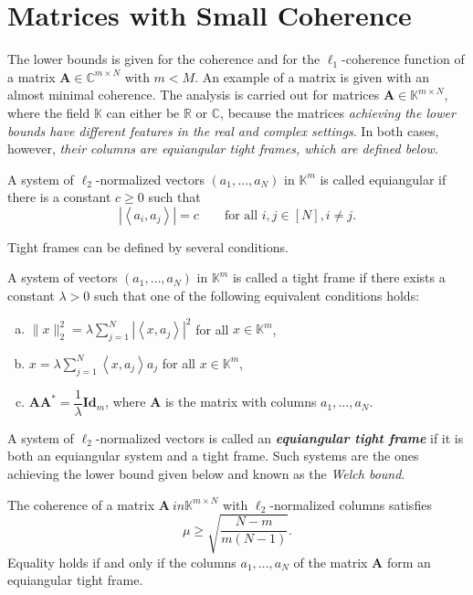 \section{Matrices with Small Coherence}
The lower bounds is given for the coherence and for the $\ell_1$-coherence function of a matrix $\mathbf{A} \in \mathbb{C}^{m \times N}$ with $m < M$. An example of a matrix is given with an almost minimal coherence. The analysis is carried out for matrices $\mathbf{A} \in \mathbb{K}^{m \times N}$, where the field $\mathbb{K}$ can either be $\mathbb{R}$ or $\mathbb{C}$, because the matrices \emph{\textcolor[rgb]{1,0,0}{achieving the lower bounds have different features in the real and complex settings}}. In both cases, however, \emph{their columns are equiangular \textcolor[rgb]{1,0,0}{tight frames}, which are defined below}.
\begin{definition}
    \label{def1.5}
    A system of $\ell_2$-normalized vectors $(a_1,\dots,a_N)$ in $\mathbb{K}^m$ is called \textcolor[rgb]{1,0,0}{equiangular} if there is a constant $c \geq 0$ such that
    \begin{equation*}
        \left|\left<a_i,a_j\right>\right| = c \qquad \text{for all }i, j \in [N], i \neq j.
    \end{equation*}
\end{definition}

Tight frames can be defined by several conditions.

\begin{definition}
    \label{def1.6}
    A system of vectors $(a_1,\dots,a_N)$ in $\mathbb{K}^m$ is called a \textcolor[rgb]{1,0,0}{tight frame} if there exists a constant $\lambda > 0$ such that one of the following equivalent conditions holds:
    \begin{enumerate} [(a)]
        \item $\|x\|_2^2 = \lambda \sum\limits_{j = 1}^N\left|\left<x, a_j\right>\right|^2$ for all $x\in \mathbb{K}^m$,
        \item $x = \lambda \sum\limits_{j=1}^N\left<x,a_j\right>a_j$ for all $x \in \mathbb{K}^m$,
        \item $\mathbf{AA}^* = \dfrac{1}{\lambda}\mathbf{Id}_m$, where $\mathbf{A}$ is the matrix with columns $a_1,\dots,a_N$.
    \end{enumerate}
\end{definition}

A system of $\ell_2$-normalized vectors is called an \emph{\textbf{\textcolor[rgb]{1,0,0}{equiangular tight frame}}} if it is both an equiangular system and a tight frame. Such systems are the ones achieving the lower bound given below and known as the \emph{\textcolor[rgb]{1,0,0}{Welch bound}}.
\begin{theorem}
    \label{th1.7}
    The coherence of a matrix $\mathbf{A}\ in \mathbb{K}^{m \times N}$ with $\ell_2$-normalized columns satisfies
    \begin{equation}
        \label{eq1.4}
        \mu \geq \sqrt{\dfrac{N-m}{m(N-1)}}.
    \end{equation}
    Equality holds if and only if the columns $a_1,\dots,a_N$ of the matrix $\mathbf{A}$ form an equiangular tight frame.
\end{theorem}

